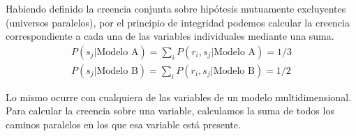 \documentclass[a4paper,10pt]{book}
\theoremstyle{definition}
\begin{document}

%
% 
% 
Habiendo definido la creencia conjunta sobre hip\'otesis mutuamente excluyentes (universos paralelos), por el principio de integridad podemos calcular la creencia correspondiente a cada una de las variables individuales mediante una suma.
%
\begin{equation}
\begin{split}
P(s_j|\text{Modelo A}) = \sum_i P(r_i, s_j|\text{Modelo A}) = 1/3 \\  P(s_j|\text{Modelo B}) = \sum_i P(r_i, s_j|\text{Modelo B}) = 1/2
\end{split}
\end{equation}


Lo mismo ocurre con cualquiera de las variables de un modelo multidimensional.
%
Para calcular la creencia sobre una variable, calculamos la suma de todos los caminos paralelos en los que esa variable est\'a presente.
\end{document}
